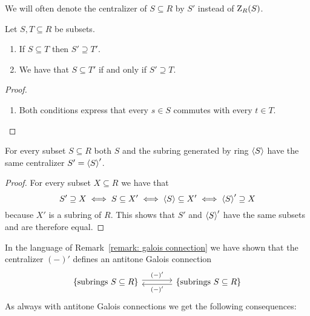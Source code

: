 \begin{notation}
  We will often denote the centralizer of $S \subseteq R$ by $S'$ instead of $\operatorname{Z}_R(S)$.
\end{notation}


\begin{lemma}
  \label{lemma: centralizes is Galois connection}
  Let $S, T \subseteq R$ be subsets.
  \begin{enumerate}
    \item
      If $S \subseteq T$ then $S' \supseteq T'$.
    \item
      We have that $S \subseteq T'$ if and only if $S' \supseteq T$.
  \end{enumerate}
\end{lemma}


\begin{proof}
  \begin{enumerate}[start = 2]
    \item
      Both conditions express that every $s \in S$ commutes with every $t \in T$.
    \qedhere
  \end{enumerate}
\end{proof}


\begin{corollary}
  For every subset $S \subseteq R$ both $S$ and the subring generated by ring $\left\langle S \right\rangle$ have the same centralizer $S' = \left\langle S \right\rangle'$.
\end{corollary}


\begin{proof}
  For every subset $X \subseteq R$ we have that
  \[
          S' \supseteq X
    \iff  S \subseteq X'
    \iff  \left\langle S \right\rangle \subseteq X'
    \iff  \left\langle S \right\rangle' \supseteq X
  \]
  because $X'$ is a subring of $R$.
  This shows that $S'$ and $\left\langle S \right\rangle'$ have the same subsets and are therefore equal.
\end{proof}


\begin{fluff}
  In the language of Remark~\ref{remark: galois connection} we have shown that the centralizer $(-)'$ defines an antitone Galois connection
  \[
  \begin{tikzcd}[column sep = large]
      \{ \text{subrings $S \subseteq R$} \}
      \arrow[shift left]{r}[above]{(-)'}
    & \{ \text{subrings $S \subseteq R$} \}
      \arrow[shift left]{l}[below]{(-)'}
  \end{tikzcd}
  \]
  As always with antitone Galois connections we get the following consequences:
\end{fluff}


